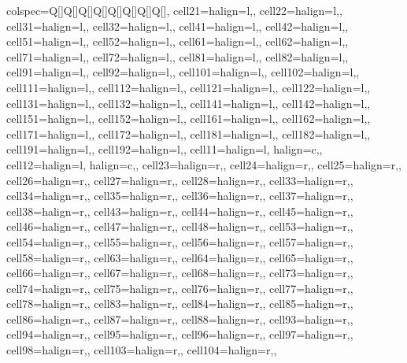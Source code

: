 \begin{table}
\centering
\begin{tblr}[         %
]                     %
{                     %
colspec={Q[]Q[]Q[]Q[]Q[]Q[]Q[]Q[]},
cell{2}{1}={}{halign=l,},
cell{2}{2}={}{halign=l,},
cell{3}{1}={}{halign=l,},
cell{3}{2}={}{halign=l,},
cell{4}{1}={}{halign=l,},
cell{4}{2}={}{halign=l,},
cell{5}{1}={}{halign=l,},
cell{5}{2}={}{halign=l,},
cell{6}{1}={}{halign=l,},
cell{6}{2}={}{halign=l,},
cell{7}{1}={}{halign=l,},
cell{7}{2}={}{halign=l,},
cell{8}{1}={}{halign=l,},
cell{8}{2}={}{halign=l,},
cell{9}{1}={}{halign=l,},
cell{9}{2}={}{halign=l,},
cell{10}{1}={}{halign=l,},
cell{10}{2}={}{halign=l,},
cell{11}{1}={}{halign=l,},
cell{11}{2}={}{halign=l,},
cell{12}{1}={}{halign=l,},
cell{12}{2}={}{halign=l,},
cell{13}{1}={}{halign=l,},
cell{13}{2}={}{halign=l,},
cell{14}{1}={}{halign=l,},
cell{14}{2}={}{halign=l,},
cell{15}{1}={}{halign=l,},
cell{15}{2}={}{halign=l,},
cell{16}{1}={}{halign=l,},
cell{16}{2}={}{halign=l,},
cell{17}{1}={}{halign=l,},
cell{17}{2}={}{halign=l,},
cell{18}{1}={}{halign=l,},
cell{18}{2}={}{halign=l,},
cell{19}{1}={}{halign=l,},
cell{19}{2}={}{halign=l,},
cell{1}{1}={}{halign=l, halign=c,},
cell{1}{2}={}{halign=l, halign=c,},
cell{2}{3}={}{halign=r,},
cell{2}{4}={}{halign=r,},
cell{2}{5}={}{halign=r,},
cell{2}{6}={}{halign=r,},
cell{2}{7}={}{halign=r,},
cell{2}{8}={}{halign=r,},
cell{3}{3}={}{halign=r,},
cell{3}{4}={}{halign=r,},
cell{3}{5}={}{halign=r,},
cell{3}{6}={}{halign=r,},
cell{3}{7}={}{halign=r,},
cell{3}{8}={}{halign=r,},
cell{4}{3}={}{halign=r,},
cell{4}{4}={}{halign=r,},
cell{4}{5}={}{halign=r,},
cell{4}{6}={}{halign=r,},
cell{4}{7}={}{halign=r,},
cell{4}{8}={}{halign=r,},
cell{5}{3}={}{halign=r,},
cell{5}{4}={}{halign=r,},
cell{5}{5}={}{halign=r,},
cell{5}{6}={}{halign=r,},
cell{5}{7}={}{halign=r,},
cell{5}{8}={}{halign=r,},
cell{6}{3}={}{halign=r,},
cell{6}{4}={}{halign=r,},
cell{6}{5}={}{halign=r,},
cell{6}{6}={}{halign=r,},
cell{6}{7}={}{halign=r,},
cell{6}{8}={}{halign=r,},
cell{7}{3}={}{halign=r,},
cell{7}{4}={}{halign=r,},
cell{7}{5}={}{halign=r,},
cell{7}{6}={}{halign=r,},
cell{7}{7}={}{halign=r,},
cell{7}{8}={}{halign=r,},
cell{8}{3}={}{halign=r,},
cell{8}{4}={}{halign=r,},
cell{8}{5}={}{halign=r,},
cell{8}{6}={}{halign=r,},
cell{8}{7}={}{halign=r,},
cell{8}{8}={}{halign=r,},
cell{9}{3}={}{halign=r,},
cell{9}{4}={}{halign=r,},
cell{9}{5}={}{halign=r,},
cell{9}{6}={}{halign=r,},
cell{9}{7}={}{halign=r,},
cell{9}{8}={}{halign=r,},
cell{10}{3}={}{halign=r,},
cell{10}{4}={}{halign=r,},
}
\end{tblr}
\end{table}
